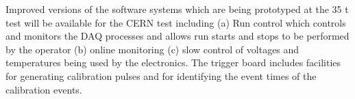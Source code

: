 Improved versions of the software systems which are being prototyped at the 
35 t test will be available for the CERN test including (a) Run control which 
controls and monitors the DAQ processes and allows run starts and stops to
be performed by the operator (b) online monitoring (c) slow control of 
voltages and temperatures being used by the electronics. The trigger board includes facilities 
for generating calibration pulses and for identifying the event times of 
the calibration events.

